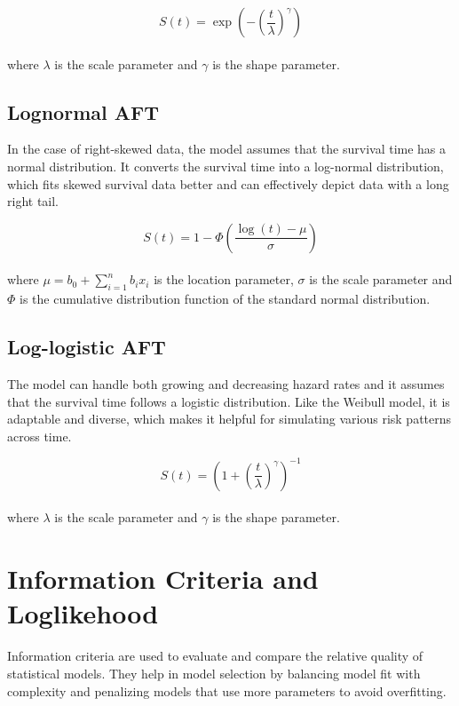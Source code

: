 \documentclass[doublespacing,12pt]{report}
\begin{document}
\begin{equation}
    S(t) = \exp\left(-\left(\frac{t}{\lambda}\right)^\gamma\right)
\end{equation}\\
where \(\lambda\) is the scale parameter and \(\gamma\) is the shape parameter.

\subsection{Lognormal AFT}
In the case of right-skewed data, the model assumes that the survival time has a normal distribution. It converts the survival time into a log-normal distribution, which fits skewed survival data better and can effectively depict data with a long right tail.

\begin{equation}
    S(t) = 1 - \Phi\left(\frac{\log(t) - \mu}{\sigma}\right)
\end{equation}\\
where \(\mu = b_0 + \sum_{i=1}^{n}{b_i x_i}\) is the location parameter, \(\sigma\) is the scale parameter and \(\Phi\) is the cumulative distribution function of the standard normal distribution.

\subsection{Log-logistic AFT}
The model can handle both growing and decreasing hazard rates and it assumes that the survival time follows a logistic distribution. Like the Weibull model, it is adaptable and diverse, which makes it helpful for simulating various risk patterns across time.


\begin{equation}
    S(t) = \left(1 + \left(\frac{t}{\lambda}\right)^\gamma\right)^{-1}
\end{equation}\\
where \(\lambda\) is the scale parameter and \(\gamma\) is the shape parameter.


 
\section{Information Criteria and Loglikehood}

Information criteria are used to evaluate and compare the relative quality of statistical models. They help in model selection by balancing model fit with complexity and penalizing models that use more parameters to avoid overfitting.
\end{document}
